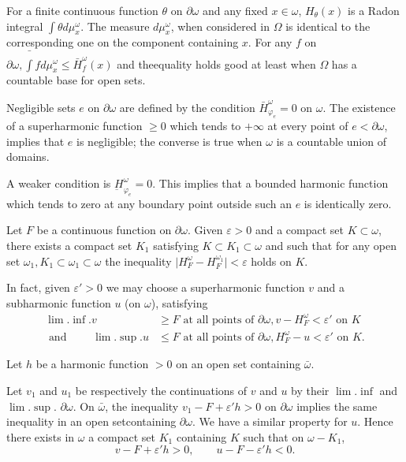 For a finite continuous function $\theta$ on $\partial \omega$ and any
fixed $x \in \omega$, $H_\theta (x)$ is a Radon integral $\int \theta
d \mu^\omega_x$. The measure $d \mu^\omega_x$, when considered in
$\Omega$ is identical to the corresponding one on the component
containing $x$. For any $f$ on $\partial \omega, \bar{\int}f d
\mu^\omega_x \leq \bar{H}^\omega_f (x)$ and the\pageoriginale equality holds good at
least when $\Omega$ has a countable base for open sets. 

Negligible sets $e$ on $\partial \omega$ are defined by the condition
$\bar{H}^\omega_{\varphi_e}= 0$ on $\omega$. The existence of a
superharmonic function $\geq 0$ which tends to $+ \infty$ at every
point of $e < \partial \omega$, implies that $e$ is negligible; the
converse is true when $\omega$ is a countable union of domains. 

A weaker condition is $\underbar{H}^\omega_{\varphi_e}=0$. This
implies that a bounded harmonic function which tends to zero at any
boundary point outside such an $e$ is identically zero. 

\begin{prop}\label{p4:chap6:sec28:prop17}%
  Let $F$ be a continuous function on
  $\partial \omega$. Given $\varepsilon > 0$ and a compact set $K
  \subset \omega$, there exists a compact set $K_1$ satisfying $K
  \subset K_1 \subset \omega$ and such that for any open set
  $\omega_1, K_1 \subset \omega_1 \subset \omega$ the inequality
  $\bigg | H^\omega_F - H^{\omega_1}_F \bigg | < \varepsilon$ holds on
  $K$. 
\end{prop}

In fact, given $\varepsilon' > 0$ we may choose a superharmonic
function $v$ and a subharmonic function $u$ (on $\omega$), satisfying 
\begin{align*}
  \lim. \inf. v & \geq F \text{ at all points of } \partial \omega,
  v-H^\omega_F < \varepsilon' \text{ on }K \\ 
  \text{ and } \qquad \lim. \sup. u & \leq  F \text{ at all points of
  } \partial \omega, H^\omega_F -u < \varepsilon' \text{ on }K. 
\end{align*}

Let $h$ be a harmonic function $> 0 $ on an open set containing $\bar{\omega}$.

Let $v_1$ and $u_1$ be respectively the continuations of $v$ and $u$
by their $\lim.  \inf $ and $\lim.  \sup$. $\partial \omega$.  On
$\bar{\omega}$, the 
inequality $v_1 - F + \varepsilon' h > 0 $ on $\partial \omega$
implies the same inequality in an open set\pageoriginale containing $\partial
\omega$. We have a similar property for $u$. Hence there exists in
$\omega$ a compact set $K_1$ containing $K$ such that on $\omega -
K_1$, 
$$
v-F+\varepsilon' h > 0,  \qquad u-F-\varepsilon' h < 0. 
$$

